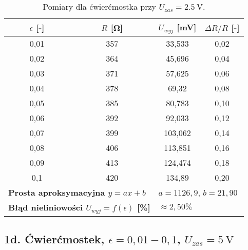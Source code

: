 \documentclass[12pt, a4paper]{article}
\begin{document}
	\begin{table}[H]
		\centering
		\caption{Pomiary dla ćwierćmostka przy $U_{zas} = \SI{2.5}{\volt}$.}
		\begin{tabular}{cccc}
			\toprule
			$\epsilon$ [-] & $R$ [\si{\ohm}] & $U_{wyj}$ [\si{\milli\volt}] & $\Delta R/R$ [-] \\
			\midrule
			0,01 & 357 & 33,533 & 0,02 \\
			0,02 & 364 & 45,696 & 0,04 \\
			0,03 & 371 & 57,625 & 0,06 \\
			0,04 & 378 & 69,32 & 0,08 \\
			0,05 & 385 & 80,783 & 0,10 \\
			0,06 & 392 & 92,033 & 0,12 \\
			0,07 & 399 & 103,062 & 0,14 \\
			0,08 & 406 & 113,851 & 0,16 \\
			0,09 & 413 & 124,474 & 0,18 \\
			0,1 & 420 & 134,89 & 0,20 \\
			\midrule
			\multicolumn{2}{l}{\textbf{Prosta aproksymacyjna $y = ax + b$}} & \multicolumn{2}{l}{$a = 1126,9$, $b = 21,90$} \\
			\multicolumn{2}{l}{\textbf{Błąd nieliniowości $U_{wyj} = f(\epsilon)$ [\%]}} & \multicolumn{2}{l}{$\approx 2,50 \%$} \\
			\bottomrule
		\end{tabular}
	\end{table}
	
	\subsection{1d. Ćwierćmostek, $\epsilon = 0,01-0,1$, $U_{zas} = \SI{5}{\volt}$}
	
\end{document}
